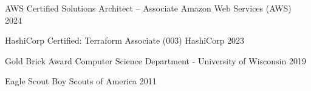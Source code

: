 \begin{cvhonors}
    \cvhonor
        {AWS Certified Solutions Architect – Associate} %
        {Amazon Web Services (AWS)} %
        {} %
        {2024} %

    \cvhonor
        {HashiCorp Certified: Terraform Associate (003)} %
        {HashiCorp} %
        {} %
        {2023} %
    
    \cvhonor
        {Gold Brick Award} %
        {Computer Science Department - University of Wisconsin} %
        {} %
        {2019} %

    \cvhonor
        {Eagle Scout}
        {Boy Scouts of America}
        {}
        {2011}
\end{cvhonors}
